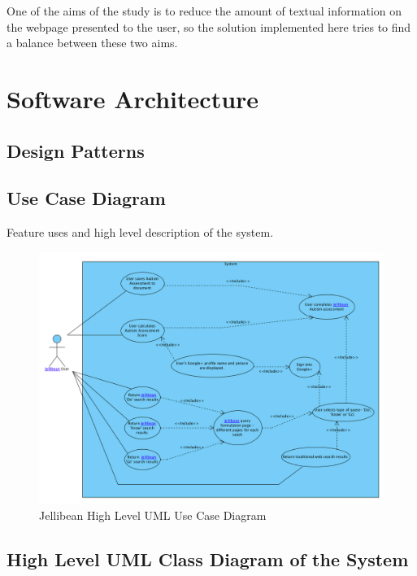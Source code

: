 \documentclass[a4paper, 11pt]{article}
\begin{document}
One of the aims of the study is to reduce the amount of textual information on the webpage presented to the user, so the solution implemented here tries to find a balance between these two aims.   




\section{Software Architecture}

\subsection{Design Patterns}

\subsection{Use Case Diagram}

Feature uses and high level description of the system.

\begin{figure}[H]
\begin{center}
\includegraphics[scale=0.45]{JBeanUseCase}
\caption{Jellibean High Level UML Use Case Diagram}
\label{JBeanUseCase1}
\end{center}
\end{figure}

\subsection{High Level UML Class Diagram of the System}
\end{document}

